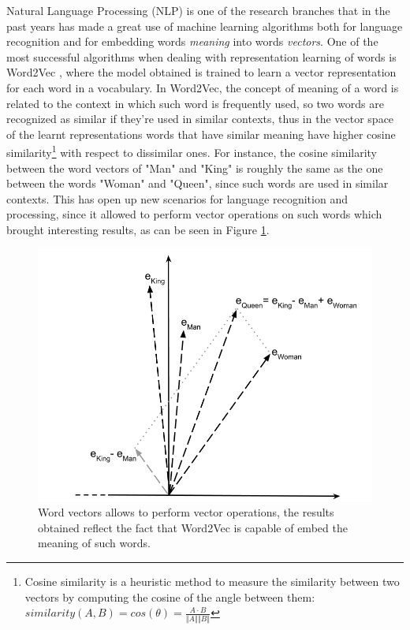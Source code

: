 \documentclass[%
    corpo=13.5pt,
    twoside,
    oldstyle,
    tipotesi=magistrale,
    greek,
    evenboxes
]{toptesi}
\begin{document}
Natural Language Processing (NLP) is one of the research branches that in
the past years has made a great use of machine learning algorithms both for
language recognition and for embedding words \emph{meaning} into words
\emph{vectors}.
One of the most successful algorithms when dealing with representation learning
of words is Word2Vec \cite{mikolov2013}, where the model obtained is trained to
learn a vector representation for each word in a vocabulary.
In Word2Vec, the concept of meaning of a word is related to the context in
which such word is frequently used, so two words are recognized as similar if
they're used in similar contexts, thus in the vector space of the learnt
representations words that have similar meaning have higher
cosine similarity\footnote{
    Cosine similarity is a heuristic method to measure the
    similarity between two vectors by computing the cosine of the angle between
    them:
    $similarity(A,B) = cos(\theta) = \frac{A \cdot B}{\Vert A \Vert \Vert B \Vert}$
}
with respect to dissimilar ones.
For instance, the cosine similarity between the word vectors of "Man" and "King"
is roughly the same as the one between the words "Woman" and "Queen", since such
words are used in similar contexts. This has open up new scenarios for
language recognition and processing, since it allowed to perform vector
operations on such words which brought interesting results, as can be seen
in Figure \ref{fig:word2vec}.

\begin{figure}[h]
    \centering
    \includegraphics[scale=0.4]{img/word2vec.png}
    \caption{
        Word vectors allows to perform vector operations, the results
        obtained reflect the fact that Word2Vec is capable of embed the
        meaning of such words.
    }
    \label{fig:word2vec}
    \end{figure}
\end{document}
